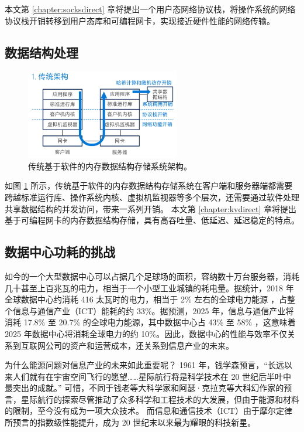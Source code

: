 本文第 \ref{chapter:socksdirect} 章将提出一个用户态网络协议栈，将操作系统的网络协议栈开销转移到用户态库和可编程网卡，实现接近硬件性能的网络传输。

\subsection{数据结构处理}


\begin{figure}[htbp]
	\centering
	\includegraphics[width=0.6\textwidth]{figures/kvdirect_traditional.png}
	\caption{传统基于软件的内存数据结构存储系统架构。}
	\label{background:fig:kvdirect_traditional}
\end{figure}

如图 \ref{background:fig:kvdirect_traditional} 所示，传统基于软件的内存数据结构存储系统在客户端和服务器端都需要跨越标准运行库、操作系统内核、虚拟机监视器等多个层次，还需要通过软件处理共享数据结构的并发访问，带来一系列开销。
本文第 \ref{chapter:kvdirect} 章将提出基于可编程网卡的内存数据结构存储，具有高吞吐量、低延迟、延迟稳定的特点。


\iffalse
\subsection{数据中心功耗的挑战}

如今的一个大型数据中心可以占据几个足球场的面积，容纳数十万台服务器，消耗几十甚至上百兆瓦的电力，相当于一个小型工业城镇的耗电量。据统计，2018 年全球数据中心约消耗 416 太瓦时的电力，相当于 2\% 左右的全球电力能源 \cite{datacenter-energy}，占整个信息与通信产业（ICT）能耗的约 33\%。据预测，2025 年，信息与通信产业将消耗 17.8\% 至 20.7\% 的全球电力能源，其中数据中心占 43\% 至 58\% \cite{power-consumption}，这意味着 2025 年数据中心将消耗全球电力的约 10\%。因此，数据中心的性能与效率不仅关系到互联网公司的资产和运营成本，还关系到信息产业的未来。

为什么能源问题对信息产业的未来如此重要呢？
1961 年，钱学森预言，``长远以来人们就有在宇宙空间飞行的愿望……星际航行将是科学技术在 20 世纪后半叶中最突出的成就。'' \cite{qianxuesen}
可惜，不同于钱老等大科学家和阿瑟·克拉克等大科幻作家的预言，星际航行的探索尽管推动了众多科学和工程技术的大发展，但由于能源和材料的限制，至今没有成为一项大众技术。
而信息和通信技术（ICT）由于摩尔定律所预言的指数级性能提升，成为 20 世纪末以来最为耀眼的科技新星。


